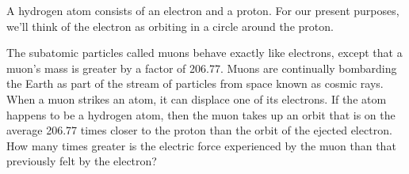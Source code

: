         A hydrogen atom consists of an electron and a proton. For our
        present purposes, we'll think of the electron as orbiting in
        a circle around the proton.
        
        The subatomic particles called muons behave exactly like
        electrons, except that a muon's mass is greater by a factor
        of 206.77.  Muons are continually bombarding the Earth as
        part of the stream of particles from space known as cosmic
        rays.  When a muon strikes an atom, it can displace one of
        its electrons.  If the atom happens to be a hydrogen atom,
        then the muon takes up an orbit that is on the average
        206.77 times closer to the proton than the orbit of the
        ejected electron.  How many times greater is the electric
        force experienced by the muon than that previously
        felt by the electron?
